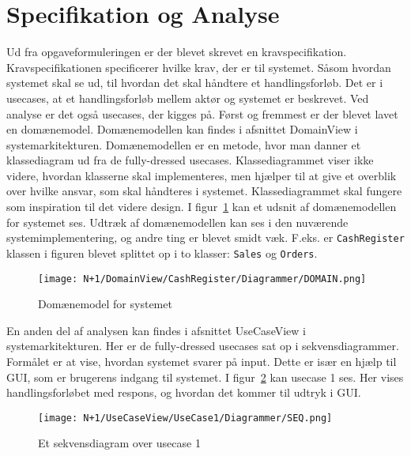 \section{Specifikation og Analyse}
\label{sec:specandanal}
Ud fra opgaveformuleringen er der blevet skrevet en kravspecifikation. Kravspecifikationen specificerer hvilke krav, der er til \gls{system}et. Såsom hvordan \gls{system}et skal se ud, til hvordan det skal håndtere et handlingsforløb. Det er i \gls{usecase}s, at et handlingsforløb mellem aktør og \gls{system}et er beskrevet. Ved analyse er det også \gls{usecase}s, der kigges på.
\newline\newline
Først og fremmest er der blevet lavet en domænemodel. Domænemodellen kan findes i afsnittet DomainView i systemarkitekturen. Domænemodellen er en metode, hvor man danner et klassediagram ud fra de fully-dressed \gls{usecase}s. Klassediagrammet viser ikke videre, hvordan klasserne skal implementeres, men hjælper til at give et overblik over hvilke ansvar, som skal håndteres i \gls{system}et. Klassediagrammet skal fungere som inspiration til det videre design. 
\newline\newline
I figur~\ref{fig:domainmodel} kan et udsnit af domænemodellen for \gls{system}et ses. Udtræk af domænemodellen kan ses i den nuværende systemimplementering, og andre ting er blevet smidt væk. F.eks. er \texttt{CashRegister} klassen i figuren blevet splittet op i to klasser: \texttt{Sales} og \texttt{Orders}.

\begin{figure}[H]
	\centering
	\texttt{[image: N+1/DomainView/CashRegister/Diagrammer/DOMAIN.png]}
	\caption{Domænemodel for \Gls{system}et}
	\label{fig:domainmodel}
\end{figure}

En anden del af analysen kan findes i afsnittet UseCaseView i systemarkitekturen. Her er de fully-dressed \gls{usecase}s sat op i sekvensdiagrammer. Formålet er at vise, hvordan \gls{system}et svarer på input. Dette er især en hjælp til \gls{GUI}, som er brugerens indgang til systemet. I figur~\ref{fig:usecaseviewseq} kan \gls{usecase} 1 ses. Her vises handlingsforløbet med respons, og hvordan det kommer til udtryk i \gls{GUI}.

\begin{figure}[H]
	\centering
	\texttt{[image: N+1/UseCaseView/UseCase1/Diagrammer/SEQ.png]}
	\caption{Et sekvensdiagram over \gls{usecase} 1}
	\label{fig:usecaseviewseq}
\end{figure}